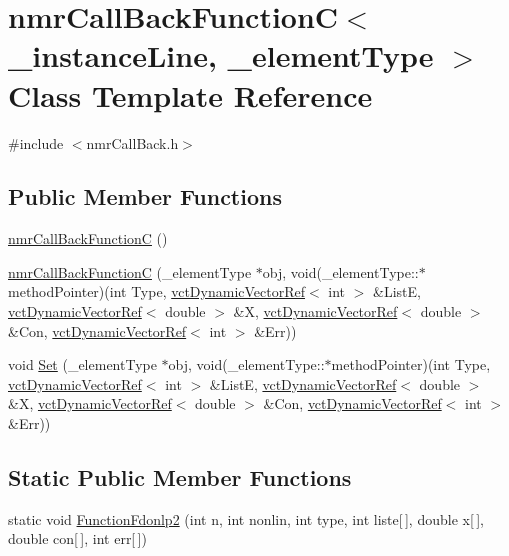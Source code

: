 \hypertarget{classnmr_call_back_function_c}{}\section{nmr\+Call\+Back\+Function\+C$<$ \+\_\+instance\+Line, \+\_\+element\+Type $>$ Class Template Reference}
\label{classnmr_call_back_function_c}


{\ttfamily \#include $<$nmr\+Call\+Back.\+h$>$}

\subsection*{Public Member Functions}
\begin{DoxyCompactItemize}
\item 
\hyperlink{classnmr_call_back_function_c_a9a4fefff2b562c1fdb55b3a752cd30ac}{nmr\+Call\+Back\+Function\+C} ()
\item 
\hyperlink{classnmr_call_back_function_c_a8f4d5992610a14641090b9a2d0ae8bab}{nmr\+Call\+Back\+Function\+C} (\+\_\+element\+Type $\ast$obj, void(\+\_\+element\+Type\+::$\ast$method\+Pointer)(int Type, \hyperlink{classvct_dynamic_vector_ref}{vct\+Dynamic\+Vector\+Ref}$<$ int $>$ \&List\+E, \hyperlink{classvct_dynamic_vector_ref}{vct\+Dynamic\+Vector\+Ref}$<$ double $>$ \&X, \hyperlink{classvct_dynamic_vector_ref}{vct\+Dynamic\+Vector\+Ref}$<$ double $>$ \&Con, \hyperlink{classvct_dynamic_vector_ref}{vct\+Dynamic\+Vector\+Ref}$<$ int $>$ \&Err))
\item 
void \hyperlink{classnmr_call_back_function_c_a72834b848c5c3b681d4359450756d782}{Set} (\+\_\+element\+Type $\ast$obj, void(\+\_\+element\+Type\+::$\ast$method\+Pointer)(int Type, \hyperlink{classvct_dynamic_vector_ref}{vct\+Dynamic\+Vector\+Ref}$<$ int $>$ \&List\+E, \hyperlink{classvct_dynamic_vector_ref}{vct\+Dynamic\+Vector\+Ref}$<$ double $>$ \&X, \hyperlink{classvct_dynamic_vector_ref}{vct\+Dynamic\+Vector\+Ref}$<$ double $>$ \&Con, \hyperlink{classvct_dynamic_vector_ref}{vct\+Dynamic\+Vector\+Ref}$<$ int $>$ \&Err))
\end{DoxyCompactItemize}
\subsection*{Static Public Member Functions}
\begin{DoxyCompactItemize}
\item 
static void \hyperlink{classnmr_call_back_function_c_a260b8059a5bca564bc994a92f03d9db9}{Function\+Fdonlp2} (int n, int nonlin, int type, int liste\mbox{[}$\,$\mbox{]}, double x\mbox{[}$\,$\mbox{]}, double con\mbox{[}$\,$\mbox{]}, int err\mbox{[}$\,$\mbox{]})
\end{DoxyCompactItemize}

